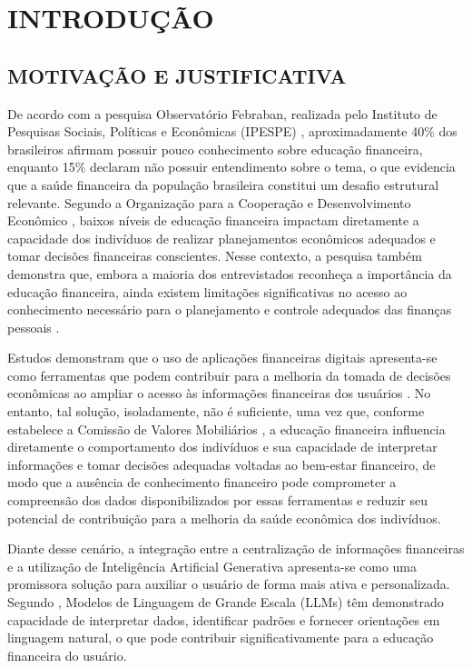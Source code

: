 \documentclass[12pt]{article}
\begin{document}
\section{INTRODUÇÃO}

\subsection{MOTIVAÇÃO E JUSTIFICATIVA}

  De acordo com a pesquisa Observatório Febraban, realizada pelo Instituto de Pesquisas Sociais, Políticas e Econômicas (IPESPE) \cite{febraban:2025}, aproximadamente 40\% dos brasileiros afirmam possuir pouco conhecimento sobre educação financeira, enquanto 15\% declaram não possuir entendimento sobre o tema, o que evidencia que a saúde financeira da população brasileira constitui um desafio estrutural relevante. Segundo a Organização para a Cooperação e Desenvolvimento Econômico \cite{oecd:2023}, baixos níveis de educação financeira impactam diretamente a capacidade dos indivíduos de realizar planejamentos econômicos adequados e tomar decisões financeiras conscientes. Nesse contexto, a pesquisa também demonstra que, embora a maioria dos entrevistados reconheça a importância da educação financeira, ainda existem limitações significativas no acesso ao conhecimento necessário para o planejamento e controle adequados das finanças pessoais \cite{febraban:2025}.
  
  Estudos demonstram que o uso de aplicações financeiras digitais apresenta-se como ferramentas que podem contribuir para a melhoria da tomada de decisões econômicas ao ampliar o acesso às informações financeiras dos usuários \cite{carlin2023mobile}. No entanto, tal solução, isoladamente, não é suficiente, uma vez que, conforme estabelece a Comissão de Valores Mobiliários \cite{cvm:2022}, a educação financeira influencia diretamente o comportamento dos indivíduos e sua capacidade de interpretar informações e tomar decisões adequadas voltadas ao bem-estar financeiro, de modo que a ausência de conhecimento financeiro pode comprometer a compreensão dos dados disponibilizados por essas ferramentas e reduzir seu potencial de contribuição para a melhoria da saúde econômica dos indivíduos.

  Diante desse cenário, a integração entre a centralização de informações financeiras e a utilização de Inteligência Artificial Generativa apresenta-se como uma promissora solução para auxiliar o usuário de forma mais ativa e personalizada. Segundo \cite{li2023large}, Modelos de Linguagem de Grande Escala (LLMs) têm demonstrado capacidade de interpretar dados, identificar padrões e fornecer orientações em linguagem natural, o que pode contribuir significativamente para a educação financeira do usuário.
\end{document}
